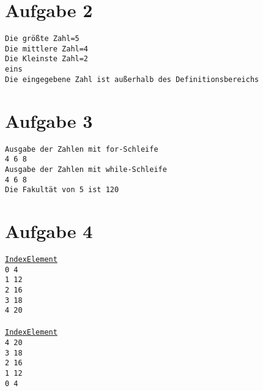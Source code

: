 \section*{Aufgabe 2}
\texttt{Die größte Zahl=5\\
Die mittlere Zahl=4\\
Die Kleinste Zahl=2\\
eins\\
Die eingegebene Zahl ist außerhalb des Definitionsbereichs\\}
\section*{Aufgabe 3}
\texttt{Ausgabe der Zahlen mit for-Schleife \\
4 6 8\\
Ausgabe der Zahlen mit while-Schleife\\
4 6 8\\
Die Fakultät von 5 ist 120\\}
\section*{Aufgabe 4}
\texttt{\underline{Index\quad Element}\\
0\hspace{29pt} 4\\
1\hspace{29pt} 12\\
2\hspace{29pt} 16\\
3\hspace{29pt} 18\\
4\hspace{29pt} 20\\\\
\underline{Index\quad Element}\\
4\hspace{29pt} 20\\
3\hspace{29pt} 18\\
2\hspace{29pt} 16\\
1\hspace{29pt} 12\\
0\hspace{29pt} 4}\\
